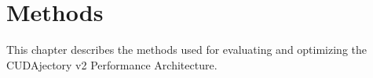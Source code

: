 \chapter{Methods}
This chapter describes the methods used for evaluating and optimizing the CUDAjectory v2 Performance Architecture.

